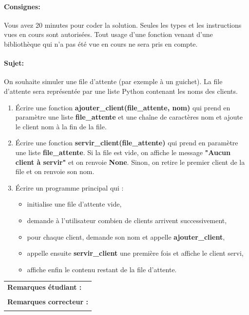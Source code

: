 \documentclass[a4paper,11pt]{article}
\begin{document}
\paragraph*{Consignes:} Vous avez 20 minutes pour coder la solution. Seules les types et les instructions vues en cours sont autorisées. Tout usage d'une fonction 
venant d'une bibliothèque qui n'a pas été vue en cours ne sera pris en compte. 


\paragraph*{Sujet:}

On souhaite simuler une file d’attente (par exemple à un guichet).
La file d’attente sera représentée par une liste Python contenant les noms des clients. 
\vspace{-0.3 cm}



\begin{enumerate}
  \item[1.] Écrire une fonction \textbf{ajouter\_client(file\_attente, nom)} qui prend en paramètre une liste \textbf{file\_attente} et une chaîne de caractères nom et ajoute le client nom à la fin de la file. 
 \item[2.] Écrire une fonction \textbf{servir\_client(file\_attente)} qui  prend en paramètre une liste \textbf{file\_attente}.  Si la file est vide, on affiche le message \textbf{"Aucun client à servir"} et on renvoie \textbf{None}. Sinon, on retire le premier client de la file et on renvoie son nom. 
 \item[3.] Écrire un programme principal qui : 
 
 \begin{itemize}
     \item initialise une file d’attente vide,
     \item demande à l’utilisateur combien de clients arrivent successivement,
     \item pour chaque client, demande son nom et appelle \textbf{ajouter\_client},
     \item appelle ensuite \textbf{servir\_client} une première fois et affiche le client servi,
     \item affiche enfin le contenu restant de la file d’attente.
 \end{itemize}

 \end{enumerate}
 
\vspace{0.4 cm}
\begin{table}[h!]
\centering
\renewcommand{\arraystretch}{1.4} %
\begin{tabular}{|p{15cm}|}
\hline
\textbf{Remarques étudiant :}    \\
 \\
\hline
\textbf{Remarques correcteur :}  \\
 \\
\hline
\end{tabular}
\end{table}
\end{document}
